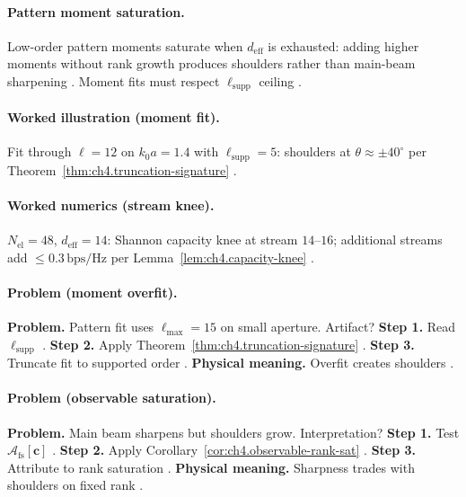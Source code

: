 \paragraph{Pattern moment saturation.}
Low-order pattern moments saturate when \(d_{\mathrm{eff}}\) is exhausted: adding higher moments without rank growth produces shoulders rather than main-beam
sharpening \cite{hansen1988,stratton1941,harrington2001,devaney2004,jackson1999}. Moment fits must respect \(\ell_{\mathrm{supp}}\) ceiling
\cite{harrington2001,collin2001}.

\paragraph{Worked illustration (moment fit).}
Fit through \(\ell=12\) on \(k_{0}a=1.4\) with \(\ell_{\mathrm{supp}}=5\): shoulders at \(\theta\approx\pm40^{\circ}\) per Theorem~\ref{thm:ch4.truncation-signature}
\cite{hansen1988,harrington2001,stratton1941,devaney2004,jackson1999}.

\paragraph{Worked numerics (stream knee).}
\(N_{\mathrm{el}}=48\), \(d_{\mathrm{eff}}=14\): Shannon capacity knee at stream \(14\)--\(16\); additional streams add \(\le0.3\,\mathrm{bps/Hz}\) per
Lemma~\ref{lem:ch4.capacity-knee} \cite{harrington2001,devaney2004,hansen1988,collin2001,jackson1999}.

\paragraph{Problem (moment overfit).}
\textbf{Problem.} Pattern fit uses \(\ell_{\max}=15\) on small aperture. Artifact?
\textbf{Step 1.} Read \(\ell_{\mathrm{supp}}\) \cite{hansen1988,harrington2001}.
\textbf{Step 2.} Apply Theorem~\ref{thm:ch4.truncation-signature} \cite{stratton1941,devaney2004}.
\textbf{Step 3.} Truncate fit to supported order \cite{jackson1999,collin2001}.
\textbf{Physical meaning.} Overfit creates shoulders \cite{harrington2001}.

\paragraph{Problem (observable saturation).}
\textbf{Problem.} Main beam sharpens but shoulders grow. Interpretation?
\textbf{Step 1.} Test \(\mathcal{A}_{\mathrm{fs}}[\mathbf{c}]\) \cite{hansen1988,stratton1941}.
\textbf{Step 2.} Apply Corollary~\ref{cor:ch4.observable-rank-sat} \cite{harrington2001,devaney2004}.
\textbf{Step 3.} Attribute to rank saturation \cite{jackson1999,collin2001}.
\textbf{Physical meaning.} Sharpness trades with shoulders on fixed rank \cite{stratton1941}.

